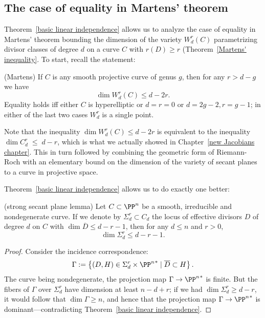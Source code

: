 \subsection{The case of equality in Martens' theorem}

Theorem~\ref{basic linear independence}  allows us to analyze the case of equality in Martens' theorem bounding the dimension of the variety $W^r_d(C)$ parametrizing divisor classes of degree $d$ on a curve $C$ with $r(D) \geq r$
(Theorem~\ref{Martens' inequality}.
To start, recall the statement:

\begin{theorem}(Martens)\label{full Martens}
If $C$ is any smooth projective curve of genus $g$, then for any $r>d-g$ we have
$$
\dim W^r_d(C) \leq d-2r.
$$
Equality holds iff either $C$ is hyperelliptic
or $d=r=0$ or $d=2g-2, r=g-1$; in either of the last two cases $W^r_d$ is
a single point.
\end{theorem}

Note that the inequality $\dim W^r_d(C) \leq d-2r$ is equivalent to the inequality $\dim C^r_d \; \leq \; d-r$, which is what we actually showed in Chapter~\ref{new Jacobians chapter}. This in turn followed by combining the geometric form of Riemann-Roch with an elementary bound on the dimension of the variety of secant planes to a curve in projective space.

Theorem~\ref{basic linear independence} allows us to do exactly one better: 

\begin{lemma}(strong secant plane lemma)\label{Strong secant plane lemma}
Let $C \subset \PP^n$ be a smooth, irreducible and nondegenerate curve. If we denote by $\Sigma^r_d \subset C_d$ the locus of effective divisors $D$ of degree $d$ on $C$ with $\dim \overline D \leq d-r-1$, then for any $d \leq n$ and $r > 0$,
$$
\dim \Sigma^r_d \leq d-r-1.
$$
\end{lemma}

\begin{proof}
Consider the incidence correspondence: 
$$
\Gamma := \left\{ (D, H) \in \Sigma^r_d\times {\PP^n}^* \mid \overline D \subset H \right\}.
$$
The curve being nondegenerate, the projection map $\Gamma \to  {\PP^n}^*$ is finite. But the fibers of $\Gamma$ over $\Sigma^r_d$ have dimension at least $n-d+r$; if we had $\dim \Sigma^r_d \geq d-r$, it would follow that $\dim \Gamma \geq n$, and hence that the projection map $\Gamma \to  {\PP^n}^*$ is dominant---contradicting Theorem~\ref{basic linear independence}.
\end{proof}


